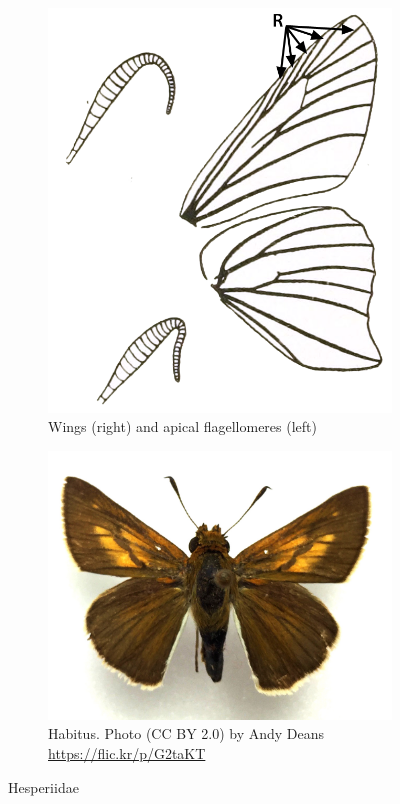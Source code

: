 \documentclass[letterpaper, 11pt]{article}
\begin{document}
\begin{figure}[ht!]
    \centering
    \begin{subfigure}[ht!]{0.36\textwidth}
        \includegraphics[width=\textwidth]{HesperiidWings}
        \caption{Wings (right) and apical flagellomeres (left) \citep[][Fig. 5]{bhl37915}}
        \label{fig:hesperiid1}
    \end{subfigure}
    \hfill %
    \begin{subfigure}[ht!]{0.55\textwidth}
        \includegraphics[width=\textwidth]{HesperiidHabitus}
        \caption{Habitus. Photo (CC BY 2.0) by Andy Deans \url{https://flic.kr/p/G2taKT}}
        \label{fig:hesperiid2}
    \end{subfigure}
    \caption{Hesperiidae}\label{fig:hesperiids}
\end{figure}
\end{document}
